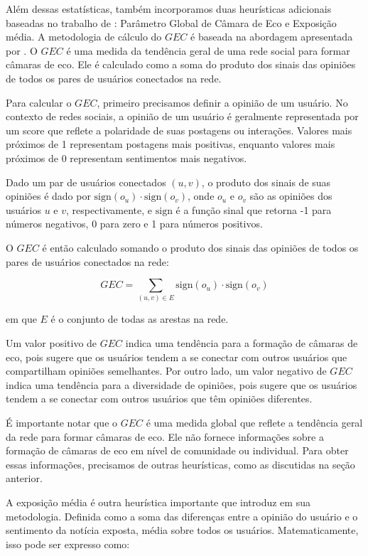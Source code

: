 Além dessas estatísticas, também incorporamos duas heurísticas adicionais baseadas no trabalho de : Parâmetro Global de Câmara de Eco e Exposição média. A metodologia de cálculo do $GEC$ é baseada na abordagem apresentada por . O $GEC$ é uma medida da tendência geral de uma rede social para formar câmaras de eco. Ele é calculado como a soma do produto dos sinais das opiniões de todos os pares de usuários conectados na rede.

Para calcular o $GEC$, primeiro precisamos definir a opinião de um usuário. No contexto de redes sociais, a opinião de um usuário é geralmente representada por um score que reflete a polaridade de suas postagens ou interações. Valores mais próximos de 1 representam postagens mais positivas, enquanto valores mais próximos de 0 representam sentimentos mais negativos.

Dado um par de usuários conectados $(u, v)$, o produto dos sinais de suas opiniões é dado por $\text{sign}(o_u) \cdot \text{sign}(o_v)$, onde $o_u$ e $o_v$ são as opiniões dos usuários $u$ e $v$, respectivamente, e $\text{sign}$ é a função sinal que retorna -1 para números negativos, 0 para zero e 1 para números positivos.

O $GEC$ é então calculado somando o produto dos sinais das opiniões de todos os pares de usuários conectados na rede:

\begin{equation}
	GEC = \sum_{(u, v) \in E} \text{sign}(o_u) \cdot \text{sign}(o_v)
\end{equation}

em que $E$ é o conjunto de todas as arestas na rede.

Um valor positivo de $GEC$ indica uma tendência para a formação de câmaras de eco, pois sugere que os usuários tendem a se conectar com outros usuários que compartilham opiniões semelhantes. Por outro lado, um valor negativo de $GEC$ indica uma tendência para a diversidade de opiniões, pois sugere que os usuários tendem a se conectar com outros usuários que têm opiniões diferentes.

É importante notar que o $GEC$ é uma medida global que reflete a tendência geral da rede para formar câmaras de eco. Ele não fornece informações sobre a formação de câmaras de eco em nível de comunidade ou individual. Para obter essas informações, precisamos de outras heurísticas, como as discutidas na seção anterior.

A exposição média é outra heurística importante que  introduz em sua metodologia. Definida como a soma das diferenças entre a opinião do usuário e o sentimento da notícia exposta, média sobre todos os usuários. Matematicamente, isso pode ser expresso como:

